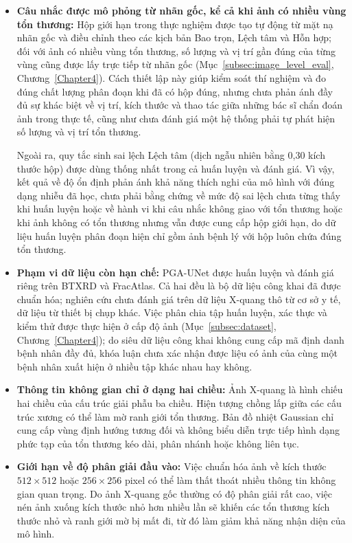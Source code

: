 \begin{itemize}
    \item \textbf{Câu nhắc được mô phỏng từ nhãn gốc, kể cả khi ảnh có nhiều vùng tổn thương:}
    Hộp giới hạn trong thực nghiệm được tạo tự động từ mặt nạ nhãn gốc và điều chỉnh theo các kịch bản Bao trọn, Lệch tâm và Hỗn hợp; đối với ảnh có nhiều vùng tổn thương, số lượng và vị trí gần đúng của từng vùng cũng được lấy trực tiếp từ nhãn gốc (Mục~\ref{subsec:image_level_eval}, Chương~\ref{Chapter4}). Cách thiết lập này giúp kiểm soát thí nghiệm và đo đúng chất lượng phân đoạn khi đã có hộp đúng, nhưng chưa phản ánh đầy đủ sự khác biệt về vị trí, kích thước và thao tác giữa những bác sĩ chẩn đoán ảnh trong thực tế, cũng như chưa đánh giá một hệ thống phải tự phát hiện số lượng và vị trí tổn thương.

    Ngoài ra, quy tắc sinh sai lệch Lệch tâm (dịch ngẫu nhiên bằng 0,30 kích thước hộp) được dùng thống nhất trong cả huấn luyện và đánh giá. Vì vậy, kết quả về độ ổn định phản ánh khả năng thích nghi của mô hình với đúng dạng nhiễu đã học, chưa phải bằng chứng về mức độ sai lệch chưa từng thấy khi huấn luyện hoặc về hành vi khi câu nhắc không giao với tổn thương hoặc khi ảnh không có tổn thương nhưng vẫn được cung cấp hộp giới hạn, do dữ liệu huấn luyện phân đoạn hiện chỉ gồm ảnh bệnh lý với hộp luôn chứa đúng tổn thương.

    \item \textbf{Phạm vi dữ liệu còn hạn chế:}
    PGA-UNet được huấn luyện và đánh giá riêng trên BTXRD và FracAtlas. Cả hai đều là bộ dữ liệu công khai đã được chuẩn hóa; nghiên cứu chưa đánh giá trên dữ liệu X-quang thô từ cơ sở y tế, dữ liệu từ thiết bị chụp khác. Việc phân chia tập huấn luyện, xác thực và kiểm thử được thực hiện ở cấp độ ảnh (Mục~\ref{subsec:dataset}, Chương~\ref{Chapter4}); do siêu dữ liệu công khai không cung cấp mã định danh bệnh nhân đầy đủ, khóa luận chưa xác nhận được liệu có ảnh của cùng một bệnh nhân xuất hiện ở nhiều tập khác nhau hay không.

    \item \textbf{Thông tin không gian chỉ ở dạng hai chiều:}
    Ảnh X-quang là hình chiếu hai chiều của cấu trúc giải phẫu ba chiều. Hiện tượng chồng lấp giữa các cấu trúc xương có thể làm mờ ranh giới tổn thương. Bản đồ nhiệt Gaussian chỉ cung cấp vùng định hướng tương đối và không biểu diễn trực tiếp hình dạng phức tạp của tổn thương kéo dài, phân nhánh hoặc không liên tục.

    \item \textbf{Giới hạn về độ phân giải đầu vào:}
    Việc chuẩn hóa ảnh về kích thước $512\times512$ hoặc $256\times256$ pixel có thể làm thất thoát nhiều thông tin không gian quan trọng. Do ảnh X-quang gốc thường có độ phân giải rất cao, việc nén ảnh xuống kích thước nhỏ hơn nhiều lần sẽ khiến các tổn thương kích thước nhỏ và ranh giới mờ bị mất đi, từ đó làm giảm khả năng nhận diện của mô hình.


\end{itemize}
